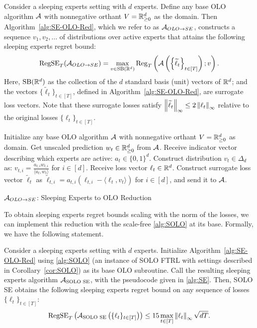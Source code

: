 \begin{fact}
    Consider a sleeping experts setting with $d$ experts. Define any base OLO algorithm $\mathcal{A}$ with nonnegative orthant $V = \mathbb{R}^d_{\geq 0}$ as the domain. Then Algorithm~\ref{alg:SE-OLO-Red}, which we refer to as $\mathcal{A}_{OLO\to SE}$, constructs a sequence $v_1, v_2, \ldots$ of distributions over active experts that attains the following sleeping experts regret bound:
    \[
    \mathrm{RegSE}_T(\mathcal{A}_{OLO\to SE}) = \max_{v \in \mathrm{SB}(\mathbb{R}^d)}\mathrm{Reg}_T \left( \mathcal{A} \left( \left\{\widetilde{\ell}_t \right\}_{t \in [T]} \right); v \right).
    \]
    Here, $\mathrm{SB}(\mathbb{R}^d)$ as the collection of the $d$ standard basis (unit) vectors of $\mathbb{R}^d$; 
    and the vectors $\{\widetilde{\ell}_t\}_{t \in [T]}$, defined in Algorithm~\ref{alg:SE-OLO-Red}, are surrogate loss vectors. Note that these surrogate losses satisfy $\left\lVert\widetilde{\ell}_t\right\rVert_\infty \leq 2 \left\lVert\ell_t\right\rVert_\infty$ relative to the original losses $\{\ell_t\}_{t \in [T]}$.
\end{fact}

\begin{algorithm}[ht]
\begin{algorithmic}
\STATE Initialize any base OLO algorithm $\mathcal{A}$ with nonnegative orthant $V = \mathbb{R}^d_{\geq 0}$ as domain.
    \STATE Get unscaled prediction $w_t \in \mathbb{R}^d_{\geq 0}$ from $\mathcal{A}$.
    \STATE Receive indicator vector describing which experts are active: $a_t \in \{0, 1\}^d$.
    \STATE Construct distribution $v_t \in \Delta_d$ as: $v_{t, i} = \frac{a_{t, i} w_{t, i}}{\langle a_t, w_t \rangle}$ for $i \in [d]$.
    \STATE Receive loss vector $\ell_t \in \mathbb{R}^d$.
    \STATE Construct surrogate loss vector $\widetilde{\ell}_t$ as $\widetilde{\ell}_{t, i} = a_{t, i} (\ell_{t, i} - \langle \ell_t, v_t \rangle)$ for $i \in [d]$, and send it to $\mathcal{A}$.
\ENDFOR
\end{algorithmic}
\caption{$\mathcal{A}_{OLO\to SE}$: Sleeping Experts to OLO Reduction~\citep{SleepingExpertsOrabona}}
\label{alg:SE-OLO-Red}
\end{algorithm}


To obtain sleeping experts regret bounds scaling with the norm of the losses, we can implement this reduction with the scale-free \cref{alg:SOLO} at its base. Formally, we have the following statement.

\begin{theorem} \label{thm:scalefree-SE}
    Consider a sleeping experts setting with $d$ experts. Initialize Algorithm~\ref{alg:SE-OLO-Red} using \cref{alg:SOLO} (an instance of SOLO FTRL with settings described in Corollary~\ref{cor:SOLO}) as its base OLO subroutine. Call the resulting sleeping experts algorithm $\mathcal{A}_\text{SOLO SE}$, with the pseudocode given in \cref{alg:SE}. Then, SOLO SE obtains the following sleeping experts regret bound on any sequence of losses $\{\ell_t\}_{t \in [T]}$:
    \[
    \mathrm{RegSE}_T \left(\mathcal{A}_\text{SOLO SE} \left(\{\ell_t\}_{t \in [T]}\right) \right) \leq 15 \max_{t \in [T]} \left\lVert\ell_t\right\rVert_\infty \sqrt{d T}.
    \]
\end{theorem}

